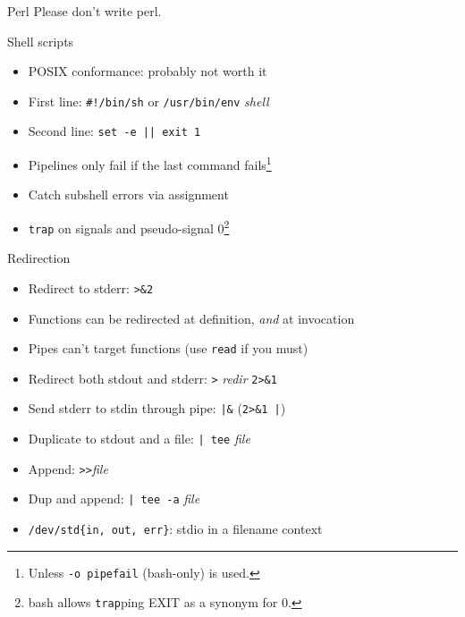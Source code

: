 \documentclass[mathserif,xcolor={dvipsnames,table}]{beamer}
\begin{document}
\begin{frame}{Perl}
Please don't write perl.
\end{frame}

\begin{frame}{Shell scripts}
\begin{itemize}
\item POSIX conformance: probably not worth it
\item First line: \texttt{\#!/bin/sh} or \texttt{/usr/bin/env} \textit{shell}
\item Second line: \texttt{set -e || exit 1}
\item Pipelines only fail if the last command fails\footnote{Unless \texttt{-o pipefail} (bash-only) is used.}
\item Catch subshell errors via assignment
\item \texttt{trap} on signals and pseudo-signal 0\footnote{bash allows \texttt{trap}ping EXIT as a synonym for 0.}
\end{itemize}
\end{frame}

\begin{frame}{Redirection}
\begin{itemize}
\item Redirect to stderr: \texttt{>\&2}
\item Functions can be redirected at definition, \textit{and} at invocation
\item Pipes can't target functions (use \texttt{read} if you must)
\item Redirect both stdout and stderr: \texttt{>} \textit{redir} \texttt{2>\&1}
\item Send stderr to stdin through pipe: \texttt{|\&} (\texttt{2>\&1 |})
\item Duplicate to stdout and a file: \texttt{| tee} \textit{file}
\item Append: \texttt{>}\texttt{>}\textit{file}
\item Dup and append: \texttt{| tee -a} \textit{file}
\item \texttt{/dev/std\{in, out, err\}}: stdio in a filename context
\end{itemize}
\end{frame}
\end{document}
